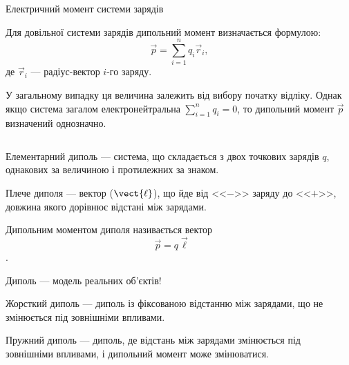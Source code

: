 \documentclass{beamer}
\begin{document}
\begin{frame}{Електричний момент системи зарядів}{}
	\begin{block}{}\justifying
		Для довільної системи зарядів дипольний момент визначається формулою:
		\begin{equation*}
			\vec{p} = \sum_{i=1}^{n}q_i\vec{r}_i,
		\end{equation*}
		де $\vec{r}_i$ --- радіус-вектор $i$-го заряду.

	\end{block}

	\begin{exampleblock}{}\justifying\small
		У загальному випадку ця
		величина залежить від вибору початку відліку. Однак якщо система
		загалом електронейтральна $\sum_{i=1}^{n} q_i = 0$, то
		дипольний момент $\vec{p}$ визначений однозначно.
	\end{exampleblock}

	\begin{columns}
		\begin{column}{0.7\linewidth}
			\begin{overprint}
				\begin{block}{}\justifying\small
					\alert{Елементарний диполь} --- система, що складається з
					двох точкових зарядів $q$, однакових за величиною і
					протилежних за знаком.

					\medskip

					\alert{Плече диполя} --- вектор ($\vect{\ell}$), що йде від <<$-$>> заряду до
					<<$+$>>, довжина якого дорівнює відстані між зарядами.

					\medskip

					\alert{Дипольним моментом} диполя називається вектор
					\begin{equation*}
						\vec{p} = q\vec{\ell}
					\end{equation*}.
				\end{block}
				\begin{alertblock}{}\centering
					Диполь --- модель реальних об'єктів!
				\end{alertblock}

				\begin{block}{}\justifying\small
					\alert{Жорсткий диполь} --- диполь із фіксованою відстанню між зарядами, що не
					змінюється під зовнішніми впливами.

					\medskip

					\alert{Пружний диполь} --- диполь, де відстань між зарядами змінюється під зовнішніми
					впливами, і дипольний момент може змінюватися.
				\end{block}
			\end{overprint}
		\end{column}
		\begin{column}{0.3\linewidth}\centering
			
		\end{column}
	\end{columns}
\end{frame}
\end{document}
